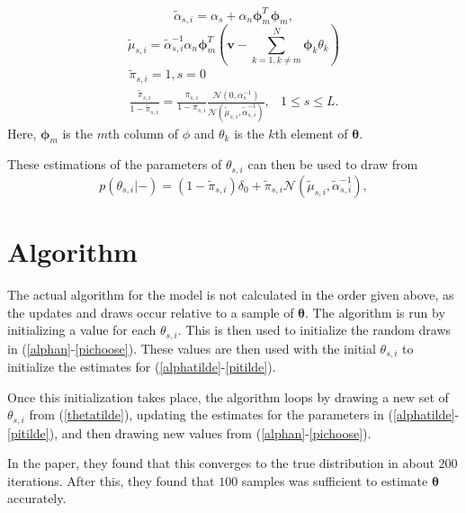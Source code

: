 \documentclass{IEEEtran}
\begin{document}
\begin{equation}
    \tilde{\alpha}_{s,i} = \alpha_s + \alpha_n
    \mathbf{\phi}_m^T\mathbf{\phi}_m,
\label{alphatilde}
\end{equation}
\begin{equation}
    \tilde{\mu}_{s,i} = 
    \tilde{\alpha}_{s,i}^{-1}\alpha_n\mathbf{\phi}_m^T(\mathbf{v}-\sum_{k=1,k\neq
      m}^N\mathbf{\phi}_k\theta_k)
\label{mutilde}
\end{equation}
\begin{equation}
  \begin{array}{cc}
    \tilde{\pi}_{s,i}   =  1, s = 0\\
    \frac{\tilde{\pi}_{s,i}}{1-\tilde{\pi}_{s,i}}  =
    \frac{\pi_{s,i}}{1-\pi_{s,i}}\frac{\mathcal{N}(0,\alpha_s^{-1})}{\mathcal{N}(\tilde{\mu}_{s,i},\tilde{\alpha}_{s,i}^{-1})},
    &1 \leq s \leq L.
  \end{array}
\label{pitilde}
\end{equation}
Here, $\mathbf{\phi}_m$ is the $m$th column of $\phi$ and $\theta_k$ is
the $k$th element of $\mathbf{\theta}$.  

These estimations of the
parameters of $\theta_{s,i}$ can then be used to draw from 
\begin{equation}
    p(\theta_{s,i}|-)  = 
    (1-\tilde{\pi}_{s,i})\delta_0+\tilde{\pi}_{s,i}\mathcal{N}(\tilde{\mu}_{s,i},\tilde{\alpha}_{s,i}^{-1}),
\label{thetatilde}
\end{equation}

\section{Algorithm}

The actual algorithm for the model is not calculated in the order
given above, as the updates and draws occur relative to a sample of
$\mathbf{\theta}$.  The algorithm is run by initializing a value for
each $\theta_{s,i}$.  This is then used to initialize the random draws
in (\ref{alphan}-\ref{pichoose}).  These values are then used with the
initial $\theta_{s,i}$ to initialize the estimates for
(\ref{alphatilde}-\ref{pitilde}).

Once this initialization takes place, the algorithm loops by drawing a
new set of $\theta_{s,i}$ from (\ref{thetatilde}), updating the
estimates for the parameters in (\ref{alphatilde}-\ref{pitilde}), and
then drawing new values from (\ref{alphan}-\ref{pichoose}).

In the paper, they found that this converges to the true distribution
in about $200$ iterations.  After this, they found that $100$ samples
was sufficient to estimate $\mathbf{\theta}$ accurately.
\end{document}
